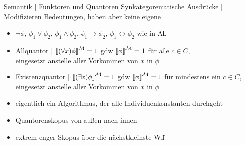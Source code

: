 \begin{frame}
  {Semantik | Funktoren und Quantoren}
  \onslide<+->
  \onslide<+->
  Synkategorematische Ausdrücke | \alert{Modifizieren Bedeutungen}, haben aber keine eigene\\
  \Halbzeile
  \begin{itemize}[<+->]
    \item \alert{$\neg\phi$}, \alert{$\phi_1\vee\phi_2$}, \alert{$\phi_1\wedge\phi_2$}, \alert{$\phi_1\rightarrow\phi_2$}, \alert{$\phi_1\leftrightarrow\phi_2$} wie in AL
      \Halbzeile
    \item Allquantor | \alert{${\llbracket{}(\forall x)\phi\rrbracket}^{\mathcal{M}}=1$} gdw \alert{${\llbracket{}\phi\rrbracket}^{\mathcal{M}}=1$} für alle $c\in C$,\\
      eingesetzt anstelle aller Vorkommen von $x$ in $\phi$
    \item Existenzquantor | \alert{${\llbracket{}(\exists x)\phi\rrbracket}^{\mathcal{M}}=1$} gdw \alert{${\llbracket{}\phi\rrbracket}^{\mathcal{M}}=1$} für mindestens ein $c\in C$,\\
      eingesetzt anstelle aller Vorkommen von $x$ in $\phi$
      \Halbzeile
    \item eigentlich ein Algorithmus, der alle Individuenkonstanten durchgeht
    \item Quantorenskopus von \alert{außen nach innen}
    \item \alert{extrem enger Skopus über die nächstkleinste Wff} 
  \end{itemize}
\end{frame}


